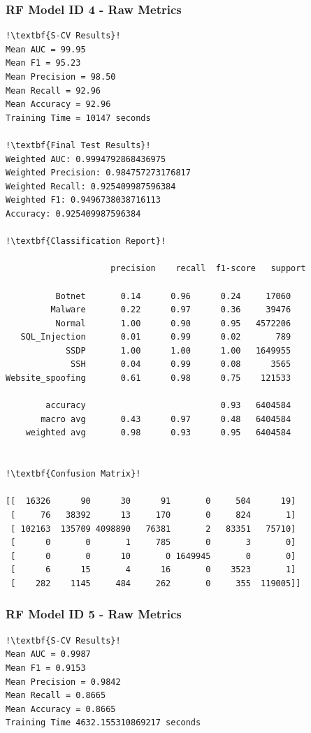 \begin{appendices}
\newpage
\subsubsection{RF Model ID 4 - Raw Metrics}
\begin{lstlisting}[escapechar=!]
!\textbf{S-CV Results}!
Mean AUC = 99.95
Mean F1 = 95.23
Mean Precision = 98.50
Mean Recall = 92.96
Mean Accuracy = 92.96
Training Time = 10147 seconds

!\textbf{Final Test Results}!
Weighted AUC: 0.9994792868436975
Weighted Precision: 0.984757273176817
Weighted Recall: 0.925409987596384
Weighted F1: 0.9496738038716113
Accuracy: 0.925409987596384

!\textbf{Classification Report}!

                     precision    recall  f1-score   support

          Botnet       0.14      0.96      0.24     17060
         Malware       0.22      0.97      0.36     39476
          Normal       1.00      0.90      0.95   4572206
   SQL_Injection       0.01      0.99      0.02       789
            SSDP       1.00      1.00      1.00   1649955
             SSH       0.04      0.99      0.08      3565
Website_spoofing       0.61      0.98      0.75    121533
           
        accuracy                           0.93   6404584
       macro avg       0.43      0.97      0.48   6404584
    weighted avg       0.98      0.93      0.95   6404584
    
    
!\textbf{Confusion Matrix}!

[[  16326      90      30      91       0     504      19]
 [     76   38392      13     170       0     824       1]
 [ 102163  135709 4098890   76381       2   83351   75710]
 [      0       0       1     785       0       3       0]
 [      0       0      10       0 1649945       0       0]
 [      6      15       4      16       0    3523       1]
 [    282    1145     484     262       0     355  119005]]
\end{lstlisting}


\newpage
\subsubsection{RF Model ID 5 - Raw Metrics}
\begin{lstlisting}[escapechar=!]
!\textbf{S-CV Results}!
Mean AUC = 0.9987
Mean F1 = 0.9153
Mean Precision = 0.9842
Mean Recall = 0.8665
Mean Accuracy = 0.8665
Training Time 4632.155310869217 seconds


\end{lstlisting}
\end{appendices}
